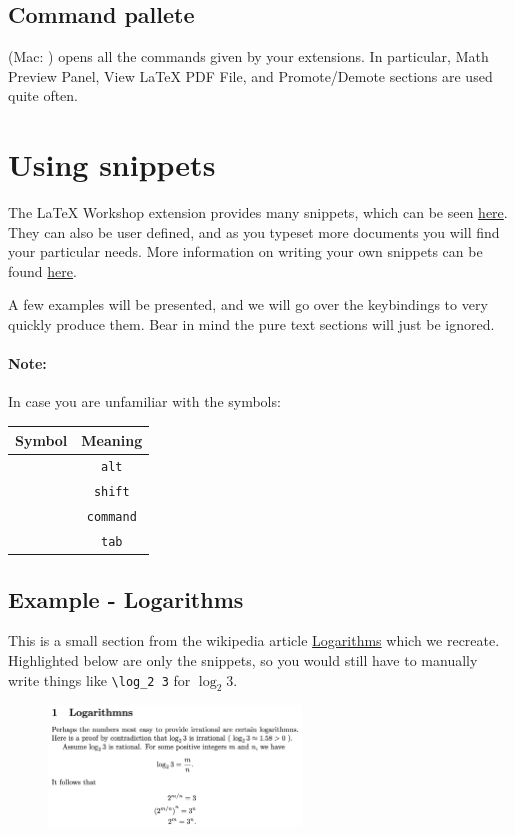 \subsection{Command pallete}
 (Mac: ) opens all the commands given by your extensions.
In particular, Math Preview Panel, View LaTeX PDF File, and Promote/Demote sections are used quite often.


\section{Using snippets}
The LaTeX Workshop extension provides many snippets, which can be seen \href{https://github.com/James-Yu/LaTeX-Workshop/wiki/Snippets}{here}.
They can also be user defined, and as you typeset more documents you will find your particular needs.
More information on writing your own snippets can be found \href{https://code.visualstudio.com/docs/editor/userdefinedsnippets}{here}.

A few examples will be presented, and we will go over the keybindings to very quickly produce them.
Bear in mind the pure text sections will just be ignored.

\paragraph{Note:}
In case you are unfamiliar with the symbols:
\begin{table}[h] \centering
\begin{tabular}{cc}
    Symbol & Meaning \\ \hline
    \keys{\Alt} &\texttt{alt}\\ 
    \keys{\shift} & \texttt{shift}\\
    \keys{\cmd} & \texttt{command}\\
    \keys{\tab} & \texttt{tab}
\end{tabular}
\end{table}

\subsection{Example - Logarithms}
This is a small section from the wikipedia article \href{https://en.wikipedia.org/wiki/Irrational_number#Logarithms}{Logarithms} which we recreate.
Highlighted below are only the snippets, so you would still have to manually write things like \verb|\log_2 3| for \( \log_2 3 \).

\begin{figure}[h]
\centering
    \includegraphics[width=0.6\textwidth]{figures/logarithmns.png}
\end{figure}

